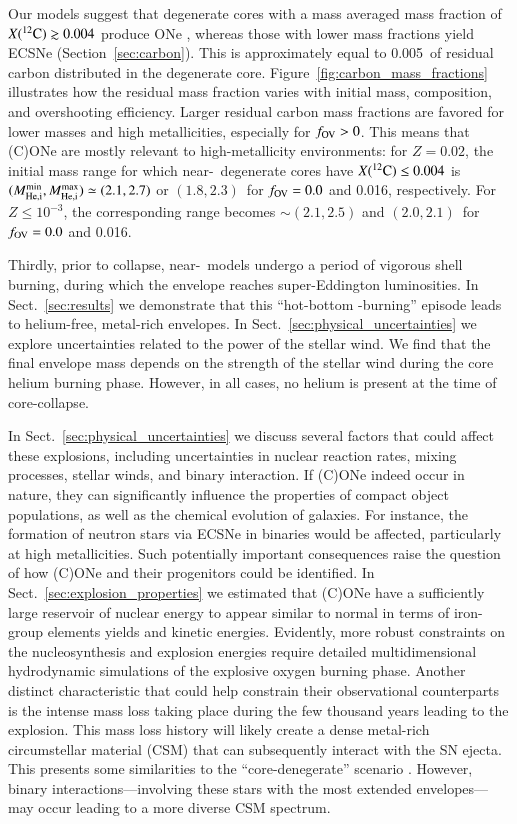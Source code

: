 \documentclass[main.tex]{subfiles}
\begin{document}
Our models suggest that degenerate cores with a mass averaged mass fraction of $X(\iso{C}{12})\gtrsim 0.004$ produce ONe \ias, whereas those with lower  mass fractions yield ECSNe (Section~\ref{sec:carbon}). This is approximately equal to 0.005\msun\ of residual carbon distributed in the degenerate core. Figure~\ref{fig:carbon_mass_fractions} illustrates how the residual  mass fraction varies with initial mass, composition, and overshooting efficiency. Larger residual carbon mass fractions are favored for lower masses and high metallicities, especially for $f_{\rm OV}>0$. This means that (C)ONe \ias are mostly relevant to high-metallicity environments: for $Z=0.02$, the initial mass range for which near-\mch\ degenerate cores have $X(\iso{C}{12})\leq 0.004$ is $(M^{\rm min}_{\rm He, i},M^{\rm max}_{\rm He, i})  \simeq (2.1, 2.7)$ or $(1.8, 2.3)$\msun\ for $f_{\rm OV}=0.0$ and 0.016, respectively. For $Z\leq10^{-3}$, the corresponding range becomes $\sim(2.1, 2.5)$ and $(2.0, 2.1)$\msun\ for $f_{\rm OV}=0.0$ and 0.016.

Thirdly, prior to collapse, near-\mch\ models undergo a period of vigorous shell burning, during which the envelope reaches super-Eddington luminosities. In Sect.~\ref{sec:results} we demonstrate that this ``hot-bottom -burning'' episode leads to helium-free, metal-rich envelopes. In Sect.~\ref{sec:physical_uncertainties} we explore uncertainties related to the power of the stellar wind. We find that the final envelope mass depends on the strength of the stellar wind during the core helium burning phase. However, in all cases, no helium is present at the time of core-collapse.  


In Sect.~\ref{sec:physical_uncertainties} we discuss several factors that could affect these explosions, including uncertainties in nuclear reaction rates, mixing processes, stellar winds, and binary interaction. If (C)ONe \ias indeed occur in nature, they can significantly influence the properties of compact object populations, as well as the chemical evolution of galaxies. For instance, the formation of neutron stars via ECSNe in binaries would be affected, particularly at high metallicities. Such potentially important consequences raise the question of how (C)ONe \ias and their progenitors could  be identified. In Sect.~\ref{sec:explosion_properties} we estimated that (C)ONe \ias have a sufficiently large reservoir of nuclear energy to appear similar to normal \ias in terms of iron-group elements yields and kinetic energies. Evidently, more robust constraints on the nucleosynthesis and  explosion energies require detailed multidimensional hydrodynamic simulations of the explosive oxygen burning phase. Another distinct characteristic that could help constrain their observational counterparts is the intense mass loss taking place during the few thousand years leading to the explosion. This mass loss history will likely create  a dense metal-rich circumstellar material (CSM) that can subsequently interact with the SN ejecta. This presents some similarities to the ``core-denegerate'' \ia scenario \citep[e.g.,][]{Wang:2016alt,soker2019,Soker:2021dii}. However, binary interactions---involving these stars with the most extended envelopes---may occur leading to a more diverse CSM spectrum.
\end{document}
